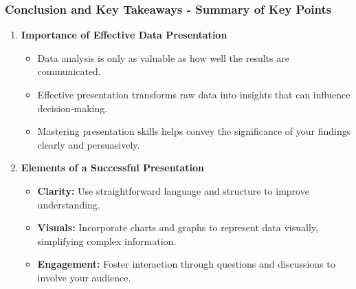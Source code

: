 \documentclass[aspectratio=169]{beamer}
\begin{document}
\begin{frame}[fragile]
    \frametitle{Conclusion and Key Takeaways - Summary of Key Points}
    \begin{enumerate}
        \item \textbf{Importance of Effective Data Presentation}
        \begin{itemize}
            \item Data analysis is only as valuable as how well the results are communicated.
            \item Effective presentation transforms raw data into insights that can influence decision-making.
            \item Mastering presentation skills helps convey the significance of your findings clearly and persuasively.
        \end{itemize}

        \item \textbf{Elements of a Successful Presentation}
        \begin{itemize}
            \item \textbf{Clarity:} Use straightforward language and structure to improve understanding.
            \item \textbf{Visuals:} Incorporate charts and graphs to represent data visually, simplifying complex information.
            \item \textbf{Engagement:} Foster interaction through questions and discussions to involve your audience.
        \end{itemize}
    \end{enumerate}
\end{frame}
\end{document}
